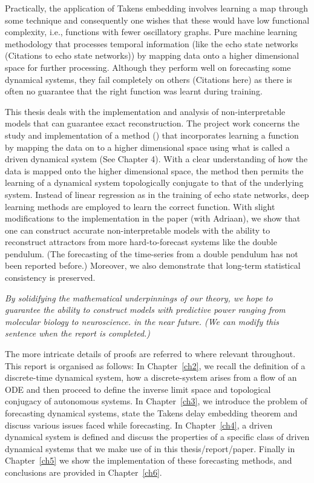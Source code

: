 \documentclass[a4paper,12pt,twoside]{report}
\begin{document}
Practically, the application of Takens embedding involves learning a map through some technique and consequently one wishes that these would have low functional complexity\cite{manjunath2021universal}, i.e., functions with fewer oscillatory graphs. Pure machine learning methodology that processes temporal information (like the echo state networks (Citations to echo state networks)) by mapping data onto a higher dimensional space for further processing. Although they perform  well on forecasting some dynamical systems, they fail completely on others (Citations here) as there is often no guarantee that the right function was learnt during training.

This thesis deals with the implementation and analysis of non-interpretable models that can guarantee exact reconstruction. The project work concerns the study and implementation of a method (\cite{manjunath2021universal}) that incorporates learning a function by mapping the data on to a higher dimensional space using what is called a driven dynamical system (See Chapter 4). With a clear understanding of how the data is mapped onto the higher dimensional space, the method then permits the learning of a dynamical system topologically conjugate to that of the underlying system. Instead of linear regression as in the training of echo state networks, deep learning methods are employed to learn the correct function. With slight modifications to the implementation in the paper (with Adriaan), we show that one can construct accurate non-interpretable models with the ability to reconstruct attractors from more hard-to-forecast systems like the double pendulum. (The forecasting of the time-series from a double pendulum has not been reported before.) Moreover, we also demonstrate that long-term statistical consistency is preserved.

\emph{By solidifying the mathematical underpinnings of our theory, we hope to guarantee the ability to construct models with predictive power ranging from molecular biology to neuroscience. in the near future. (We can modify this sentence when the report is completed.)}

The more intricate details of proofs are referred to where relevant throughout. This report is organised as follows: 
\newline In Chapter~\ref{ch2}, we recall the definition of a discrete-time dynamical system, how a discrete-system arises from a flow of an ODE and then proceed to define the inverse limit space and topological conjugacy of autonomous systems. 
\newline In Chapter~\ref{ch3}, we introduce the problem of forecasting dynamical systems, state the Takens delay embedding theorem and discuss various issues faced while forecasting. 
\newline In Chapter~\ref{ch4}, a driven dynamical system is defined and discuss the properties of a specific class of driven dynamical systems that we make use of in this thesis/report/paper. 
\newline Finally in Chapter~\ref{ch5} we show the implementation of these forecasting methods, and conclusions are provided in Chapter~\ref{ch6}.
\end{document}

